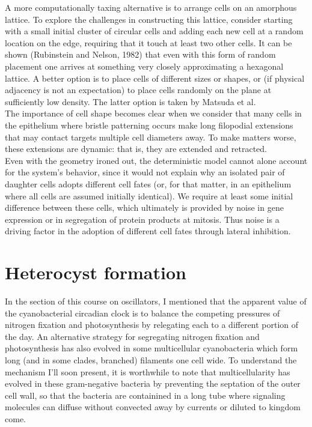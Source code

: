 \documentclass{article}
\begin{document}
A more computationally taxing alternative is to arrange cells on an amorphous lattice. To explore the challenges in constructing this lattice, consider starting with a small initial cluster of circular cells and adding each new cell at a random location on the edge, requiring that it touch at least two other cells. It can be shown (Rubinstein and Nelson, 1982) that even with this form of random placement one arrives at something very closely approximating a hexagonal lattice. A better option is to place cells of different sizes or shapes, or (if physical adjacency is not an expectation) to place cells randomly on the plane at sufficiently low density. The latter option is taken by Matsuda et al.\\

The importance of cell shape becomes clear when we consider that many cells in the epithelium where bristle patterning occurs make long filopodial extensions that may contact targets multiple cell diameters away. To make matters worse, these extensions are dynamic: that is, they are extended and retracted.\\

Even with the geometry ironed out, the deterministic model cannot alone account for the system's behavior, since it would not explain why an isolated pair of daughter cells adopts different cell fates (or, for that matter, in an epithelium where all cells are assumed initially identical). We require at least some initial difference between these cells, which ultimately is provided by noise in gene expression or in segregation of protein products at mitosis. Thus noise is a driving factor in the adoption of different cell fates through lateral inhibition.

\section*{Heterocyst formation}

In the section of this course on oscillators, I mentioned that the apparent value of the cyanobacterial circadian clock is to balance the competing pressures of nitrogen fixation and photosynthesis by relegating each to a different portion of the day. An alternative strategy for segregating nitrogen fixation and photosynthesis has also evolved in some multicellular cyanobacteria which form long (and in some clades, branched) filaments one cell wide. To understand the mechanism I'll soon present, it is worthwhile to note that multicellularity has evolved in these gram-negative bacteria by preventing the septation of the outer cell wall, so that the bacteria are containined in a long tube where signaling molecules can diffuse without convected away by currents or diluted to kingdom come.\\
\end{document}
